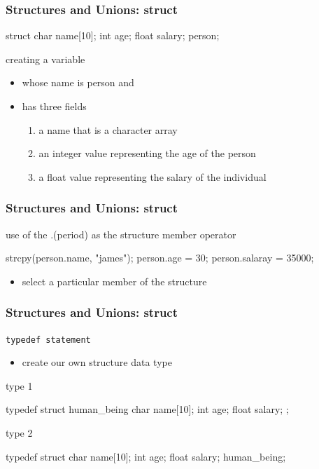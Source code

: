 \documentclass[newPxFont,sthlmFooter,nooffset]{beamer}
\begin{document}
\begin{frame}[t, fragile]
  \frametitle{Structures and Unions: struct}
\begin{codedef}
struct {
    char name[10];
    int age;
    float salary;
} person;
\end{codedef}
\bigskip
creating a variable
\begin{itemize}
\item whose name is person and
\item has three fields
  \begin{enumerate}
  \item a name that is a character array
  \item an integer value representing the age of the person
  \item a float value representing the salary of the individual
  \end{enumerate}

\end{itemize}

\end{frame}


\begin{frame}[t, fragile]
  \frametitle{Structures and Unions: struct}
use of the .(period) as the structure member operator

\begin{codedef}
strcpy(person.name, "james");
person.age = 30;
person.salaray = 35000;  
\end{codedef}
\bigskip
\begin{itemize}
\item select a particular member of the structure
\end{itemize}

 
\end{frame}


\begin{frame}[t, fragile]
  \frametitle{Structures and Unions: struct}
\texttt{typedef statement}
\begin{itemize}
\item create our own structure data type
\end{itemize}

type 1
\begin{codedef}
typedef struct human_being { 
    char name[10];
    int age;
    float salary;
};
\end{codedef}

type 2
\begin{codedef}
typedef struct { 
    char name[10]; 
    int age;
    float salary;
} human_being;
\end{codedef}
\end{frame}
\end{document}
